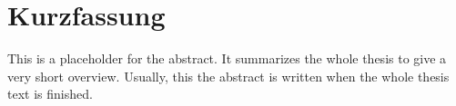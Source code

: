\chapter*{Kurzfassung}
\label{chap:kurzfassung}


This is a placeholder for the abstract. It summarizes the whole thesis
to give a very short overview. Usually, this the abstract is written
when the whole thesis text is finished.



